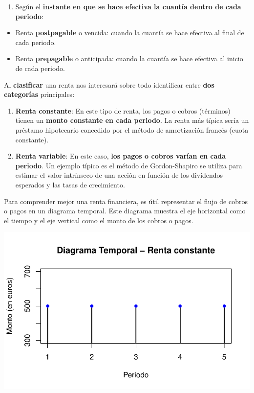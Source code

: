 \documentclass[
  letterpaper,
  DIV=11,
  numbers=noendperiod]{scrreprt}
\providecommand{\tightlist}{%
  \setlength{\itemsep}{0pt}\setlength{\parskip}{0pt}}\usepackage{longtable,booktabs,array}
\begin{document}
\begin{tcolorbox}
\begin{enumerate}
\def\labelenumi{\arabic{enumi}.}
\setcounter{enumi}{4}
\tightlist
\item
  Según el \textbf{instante en que se hace efectiva la cuantía dentro de
  cada periodo}:
\end{enumerate}

\begin{itemize}
\tightlist
\item
  Renta \textbf{postpagable} o vencida: cuando la cuantía se hace
  efectiva al final de cada periodo.
\item
  Renta \textbf{prepagable} o anticipada: cuando la cuantía se hace
  efectiva al inicio de cada periodo.
\end{itemize}

Al \textbf{clasificar} una renta nos interesará sobre todo identificar
entre \textbf{dos categorías} principales:

\begin{enumerate}
\def\labelenumi{\arabic{enumi}.}
\item
  \textbf{Renta constante}: En este tipo de renta, los pagos o cobros
  (términos) tienen un \textbf{monto constante en cada periodo}. La
  renta más típica sería un préstamo hipotecario concedido por el método
  de amortización francés (cuota constante).
\item
  \textbf{Renta variable}: En este caso, \textbf{los pagos o cobros
  varían en cada periodo}. Un ejemplo típico es el método de
  Gordon-Shapiro se utiliza para estimar el valor intrínseco de una
  acción en función de los dividendos esperados y las tasas de
  crecimiento.
\end{enumerate}

Para comprender mejor una renta financiera, es útil representar el flujo
de cobros o pagos en un diagrama temporal. Este diagrama muestra el eje
horizontal como el tiempo y el eje vertical como el monto de los cobros
o pagos.

\includegraphics{sesion02_renta_fija_files/figure-pdf/unnamed-chunk-1-1.pdf}


\end{tcolorbox}
\end{document}
